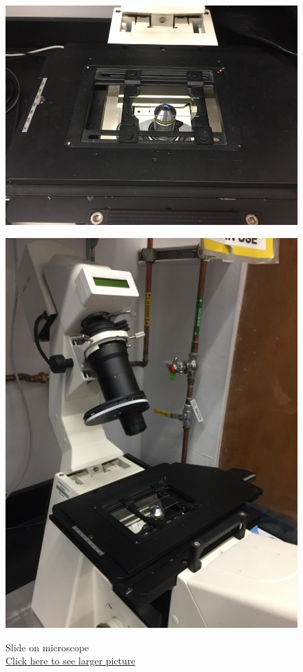 \documentclass{../lab}
\begin{document}
\begin{figure}[!h]
  \href{http://experimentationlab.berkeley.edu/sites/default/files/upimages/Slide-on-Microscope_2544.JPG}{\includegraphics[width=\linewidth,keepaspectratio]{images/Slide-on-Microscope_2544.JPG}}
  \caption{Slide on microscope\\ \href{http://experimentationlab.berkeley.edu/sites/default/files/upimages/Slide-on-Microscope_2544.JPG}{Click here to see larger picture}}
  \label{fig:MicroscopeSlide}
\endminipage\hfill
{}
  \href{http://experimentationlab.berkeley.edu/sites/default/files/upimages/1_Tilt-Microscope_2542.JPG}{\includegraphics[width=\linewidth,keepaspectratio]{images/1_Tilt-Microscope_2542.JPG}}

\end{figure}
\end{document}
